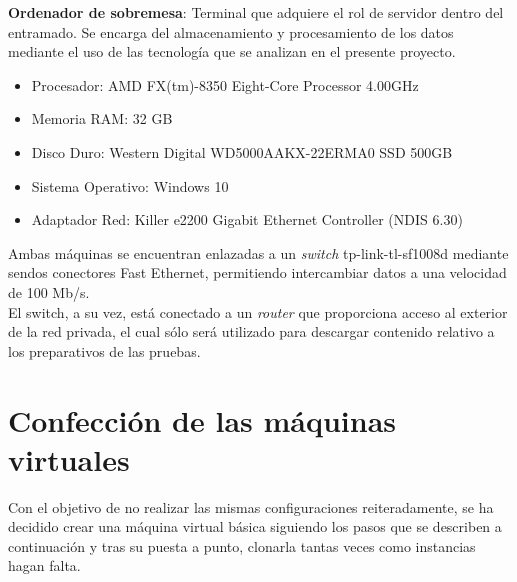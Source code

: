\textbf{Ordenador de sobremesa}: Terminal que adquiere el rol de servidor dentro del entramado. Se encarga del almacenamiento y procesamiento de los datos mediante el uso de las tecnología que se analizan en el presente proyecto.

\begin{itemize}
	\item Procesador: AMD FX(tm)-8350 Eight-Core Processor 4.00GHz
	\item Memoria RAM: 32 GB
	\item Disco Duro: Western Digital WD5000AAKX-22ERMA0 SSD 500GB
	\item Sistema Operativo: Windows 10
	\item Adaptador Red: Killer e2200 Gigabit Ethernet Controller (NDIS 6.30)
\end{itemize}

Ambas máquinas se encuentran enlazadas a un \textit{switch} tp-link-tl-sf1008d mediante sendos conectores Fast Ethernet, permitiendo intercambiar datos a una velocidad de 100 Mb/s.\\

El switch, a su vez, está conectado a un \textit{router} que proporciona acceso al exterior de la red privada, el cual sólo será utilizado para descargar contenido relativo a los preparativos de las pruebas.

\clearpage

\section{Confección de las máquinas virtuales}
 
Con el objetivo de no realizar las mismas configuraciones reiteradamente, se ha decidido crear una máquina virtual básica siguiendo los pasos que se describen a continuación y tras su puesta a punto, clonarla tantas veces como instancias hagan falta.

